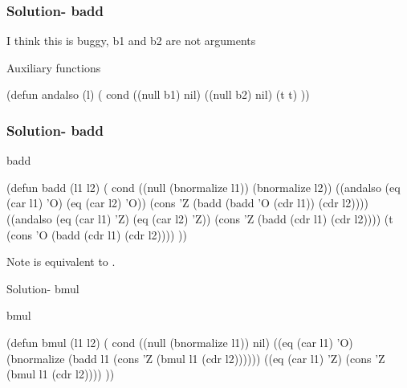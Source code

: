 \documentclass[fleqn]{beamer}
\begin{document}
\begin{frame}[fragile]
\frametitle{Solution- badd}
I think this is buggy, b1 and b2 are not arguments
\begin{block}{Auxiliary functions}
  \begin{LISP}
(defun andalso (l) (
  cond
    ((null b1) nil)
    ((null b2) nil)
    (t t)
))
    \end{LISP}
\end{block}
\end{frame}

\begin{frame}[fragile]
\frametitle{Solution- badd}
\begin{block}{badd}
  \begin{LISP}
(defun badd (l1 l2) (
  cond
    ((null (bnormalize l1)) (bnormalize l2))
    ((andalso (eq (car l1) 'O) (eq (car l2) 'O))
      (cons 'Z (badd (badd 'O (cdr l1)) (cdr l2))))
    ((andalso (eq (car l1) 'Z) (eq (car l2) 'Z))
      (cons 'Z (badd (cdr l1) (cdr l2))))
    (t (cons 'O (badd (cdr l1) (cdr l2))))
))
    \end{LISP}
\end{block}

\begin{block}{Note}
   is equivalent to .
\end{block}
\end{frame}


\begin{frame}[fragile]{Solution- bmul}
\begin{block}{bmul}
  \begin{LISP}
(defun bmul (l1 l2) (
  cond
    ((null (bnormalize l1)) nil)
    ((eq (car l1) 'O)
      (bnormalize
        (badd l1 (cons 'Z (bmul l1 (cdr l2))))))
    ((eq (car l1) 'Z) (cons 'Z (bmul l1 (cdr l2))))
))
    \end{LISP}
\end{block}
\end{frame}
\end{document}

